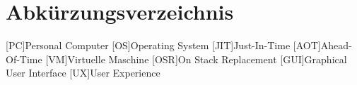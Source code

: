 \chapter*{Abkürzungsverzeichnis}
\begin{acronym}
    [PC]{Personal Computer}
    [OS]{Operating System}
    [JIT]{Just-In-Time}
    [AOT]{Ahead-Of-Time}
    [VM]{Virtuelle Maschine}
    [OSR]{On Stack Replacement}
    [GUI]{Graphical User Interface}
    [UX]{User Experience}
    
\end{acronym}